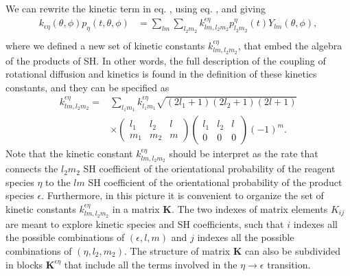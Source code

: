 \documentclass{article}
\begin{document}
We can rewrite the kinetic term in eq. , using eq. , and giving
\begin{equation}\label{eq:coupling_simplified}
\begin{aligned}
    k_{\epsilon\eta} (\theta,\phi) p_\eta(t,\theta,\phi) 
    & =
    \sum_{lm} \sum_{l_2m_2} 
    k^{\epsilon\eta}_{lm,l_2m_2} p^{\eta}_{l_2m_2}(t) Y_{lm}(\theta,\phi),
    \\
\end{aligned}
\end{equation}
where we defined a new set of kinetic constants $k^{\epsilon\eta}_{lm,l_2m_2}$, that embed the algebra of the products of SH. In other words, the full description of the coupling of rotational diffusion and kinetics is found in the definition of these kinetics constants, and they can be specified as
\begin{equation}\label{eq:kinetic_sh_prod}
\begin{aligned}
    k^{\epsilon\eta}_{lm,l_2m_2}
    =&
    \sum_{l_1m_1} k^{\epsilon\eta}_{l_1m_1}
    \sqrt{(2l_1+1)(2l_2+1)(2l+1)} \\
    &\times
    \begin{pmatrix}
        l_1 & l_2 & l\\
        m_1 & m_2 & m
    \end{pmatrix}
    \begin{pmatrix}
        l_1 & l_2 & l\\
        0 & 0 & 0
    \end{pmatrix}
    (-1)^{m}.
\end{aligned}
\end{equation}
Note that the kinetic constant $k^{\epsilon\eta}_{lm,l_2m_2}$ should be interpret as the rate that connects the $l_2m_2$ SH coefficient of the orientational probability of the reagent species $\eta$ to the $lm$ SH coefficient of the orientational probability of the product species $\epsilon$. Furthermore, in this picture it is convenient to organize the set of kinetic constants $k^{\epsilon\eta}_{lm,l_2m_2}$ in a matrix $\mathbf{K}$. The two indexes of matrix elements $K_{ij}$ are meant to explore kinetic species and SH coefficients, such that $i$ indexes all the possible combinations of $(\epsilon,l,m)$ and $j$ indexes all the possible combinations of $(\eta,l_2,m_2)$. The structure of matrix $\mathbf{K}$ can also be subdivided in blocks $\mathbf{K}^{\epsilon\eta}$ that include all the terms involved in the $\eta \rightarrow \epsilon$ transition.
\end{document}
